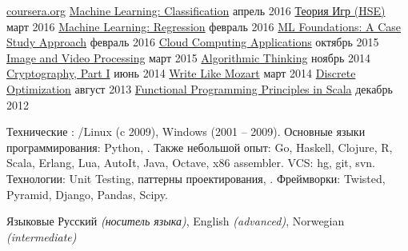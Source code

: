 \documentclass[unicode, 10pt, a4paper, oneside, fleqn]{article}
\begin{document}
\begin{minipage}[t]{0.50\textwidth}
\setlength\abovedisplayskip{0pt}
\courseplatform
    {\href{http://www.coursera.org}{coursera.org}}
    {}
    {
        \course
            {\href{}
                  {Machine Learning: Classification}}
            {апрель 2016}
            {}
        \course
            {\href{}
                  {Теория Игр (HSE)}}
            {март 2016}
            {}
        \course
            {\href{}
                  {Machine Learning: Regression}}
            {февраль 2016}
            {}
        \course
            {\href{}
                  {ML Foundations: A Case Study Approach}}
            {февраль 2016}
            {}
        \course
            {\href{}
                  {Cloud Computing Applications}}
            {октябрь 2015}
            {}
        \course
            {\href{https://drive.google.com/file/d/0B2cptPgckn74MGQ5SUVQRGVDNE0/view}
                  {Image and Video Processing}}
            {март 2015}
            {}
        \course
            {\href{https://drive.google.com/file/d/0B2cptPgckn74ZkIwTWNFYUx6STA/view?usp=sharing}
                  {Algorithmic Thinking}}
            {ноябрь 2014}
            {}
        \course
            {\href{https://drive.google.com/file/d/0B2cptPgckn74OWlrVEZlR3U3azQ/edit?usp=sharing}
                  {Cryptography, Part I}}
            {июнь 2014}
            {}
        \course
            {\href{https://drive.google.com/file/d/0B2cptPgckn74WHJkQkNTdnN4dVU/edit?usp=sharing}
                  {Write Like Mozart}}
            {март 2014}
            {}
        \course
            {\href{https://docs.google.com/file/d/0B2cptPgckn74ZnN0Znhnd3ZUejg/edit?usp=sharing}
                  {Discrete Optimization}}
            {август 2013}
            {}
        \course
            {\href{https://docs.google.com/document/d/1AWaukQ0K4C-ZcuRRqYANJuYDOPxYH7MoVdXYKHPYJ8I/edit}
                  {Functional Programming Principles in Scala}}
            {декабрь 2012}
            {}
    }
\end{minipage}




\inlineheadsection  %
    {Технические}
    {
        : /Linux (c 2009), Windows (2001 -- 2009).
        Основные языки программирования: Python, .
        Также небольшой опыт: Go, Haskell, Clojure, R, Scala, Erlang, Lua,
        AutoIt, Java, Octave, x86 assembler.
        VCS: hg, git, svn.
        Технологии: Unit Testing, паттерны проектирования, .
        Фреймворки: Twisted, Pyramid, Django, Pandas, Scipy.
    }

\inlineheadsection
    {Языковые}
    {
        Русский \emph{(носитель языка)}, English \emph{(advanced)}, Norwegian \emph{(intermediate)}
    }

\end{document}
